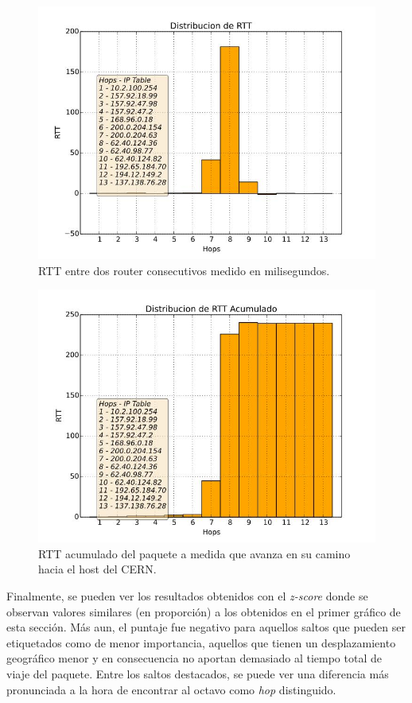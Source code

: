 \begin{figure}[H]
  \centering	
	\includegraphics[scale=0.3]{../cern-experiment/bar_rtt.jpeg}
  \caption{RTT entre dos router consecutivos medido en milisegundos.}
	\label{fig:histo-src-sitiotrabajo}
\end{figure}

\begin{figure}[H]
  \centering	
	\includegraphics[scale=0.3]{../cern-experiment/bar_rtt_acum.jpeg}
  \caption{RTT acumulado del paquete a medida que avanza en su camino hacia el host del CERN.}
	\label{fig:histo-src-sitiotrabajo}
\end{figure}

Finalmente, se pueden ver los resultados obtenidos con el \textit{z-score} donde se observan valores similares (en proporción) a los obtenidos en el primer gráfico de esta sección. Más aun, el puntaje fue negativo para aquellos saltos que pueden ser etiquetados como de menor importancia, aquellos que tienen un desplazamiento geográfico menor y en consecuencia no aportan demasiado al tiempo total de viaje del paquete. Entre los saltos destacados, se puede ver una diferencia más pronunciada a la hora de encontrar al octavo como \textit{hop} distinguido.

